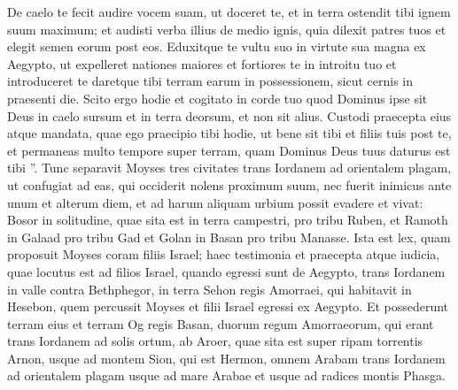 \begin{biblechapter}
\begin{biblechapter}
\begin{biblechapter}
\begin{biblechapter}
\verse De caelo te fecit audire vocem suam, ut doceret te, et in terra ostendit tibi ignem suum maximum; et audisti verba illius de medio ignis, 
\verse quia dilexit patres tuos et elegit semen eorum post eos. Eduxitque te vultu suo in virtute sua magna ex Aegypto, 
\verse ut expelleret nationes maiores et fortiores te in introitu tuo et introduceret te daretque tibi terram earum in possessionem, sicut cernis in praesenti die.
 \verse Scito ergo hodie et cogitato in corde tuo quod Dominus ipse sit Deus in caelo sursum et in terra deorsum, et non sit alius. 
\verse Custodi praecepta eius atque mandata, quae ego praecipio tibi hodie, ut bene sit tibi et filiis tuis post te, et permaneas multo tempore super terram, quam Dominus Deus tuus daturus est tibi ”.
 \verse Tunc separavit Moyses tres civitates trans Iordanem ad orientalem plagam, 
 \verse ut confugiat ad eas, qui occiderit nolens proximum suum, nec fuerit inimicus ante unum et alterum diem, et ad harum aliquam urbium possit evadere et vivat: 
\verse Bosor in solitudine, quae sita est in terra campestri, pro tribu Ruben, et Ramoth in Galaad pro tribu Gad et Golan in Basan pro tribu Manasse.
 \verse Ista est lex, quam proposuit Moyses coram filiis Israel; 
\verse haec testimonia et praecepta atque iudicia, quae locutus est ad filios Israel, quando egressi sunt de Aegypto, 
\verse trans Iordanem in valle contra Bethphegor, in terra Sehon regis Amorraei, qui habitavit in Hesebon, quem percussit Moyses et filii Israel egressi ex Aegypto. 
\verse Et possederunt terram eius et terram Og regis Basan, duorum regum Amorraeorum, qui erant trans Iordanem ad solis ortum, 
 \verse ab Aroer, quae sita est super ripam torrentis Arnon, usque ad montem Sion, qui est Hermon, 
\verse omnem Arabam trans Iordanem ad orientalem plagam usque ad mare Arabae et usque ad radices montis Phasga.
 

\end{biblechapter}
\end{biblechapter}
\end{biblechapter}
\end{biblechapter}
